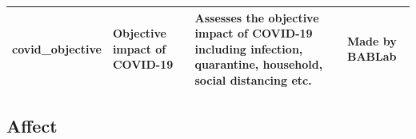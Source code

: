 \documentclass[]{book}
\begin{document}
\begin{longtable}[]{@{}llll@{}}
\begin{minipage}[t]{0.22\columnwidth}
covid\_objective\strut
\end{minipage} & \begin{minipage}[t]{0.27\columnwidth}\raggedright
Objective impact of COVID-19\strut
\end{minipage} & \begin{minipage}[t]{0.22\columnwidth}\raggedright
Assesses the objective impact of COVID-19 including infection, quarantine, household, social distancing etc.\strut
\end{minipage} & \begin{minipage}[t]{0.18\columnwidth}\raggedright
Made by BABLab\strut
\end{minipage}\tabularnewline
\bottomrule
\end{longtable}

\hypertarget{affect}{%
\subsection{Affect}\label{affect}}
\end{document}
